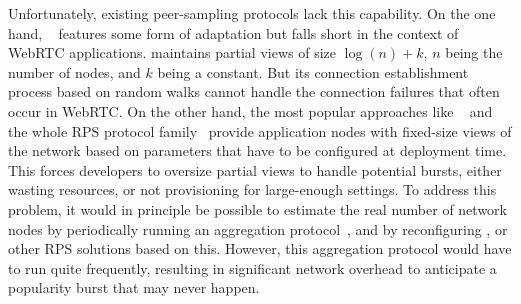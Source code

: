 Unfortunately, existing peer-sampling protocols
lack this capability. On the one hand, \SCAMP~\cite{ganesh2003peer}
features some form of adaptation but falls short in the context of
WebRTC applications. \SCAMP maintains partial views of size
$\log(n)+k$, $n$ being the number of nodes, and $k$ being a
constant. But its connection establishment process based on random
walks cannot handle the connection failures that often occur in
WebRTC. On the other hand, the most popular approaches like
\CYCLON~\cite{voulgaris2005cyclon} and the whole RPS protocol
family~\cite{jelasity2007gossip} provide application nodes with
fixed-size views of the network based on parameters that have to be
configured at deployment time. This forces developers to oversize
partial views to handle potential bursts, either wasting resources, or
not provisioning for large-enough settings.
To address this problem, it would in principle be possible to estimate
the real number of network nodes by periodically running an
aggregation protocol~\cite{montresor2004robust}, and by reconfiguring
\CYCLON, or other RPS solutions based on this. However, this aggregation
protocol would have to run quite frequently, resulting in significant
network overhead to anticipate a popularity burst that may never
happen.


